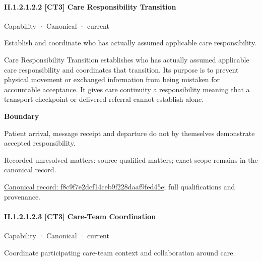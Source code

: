 \paragraph*{II.1.2.1.2.2 [CT3] Care Responsibility Transition}
\label{navigation:II.1.2.1.2.2}

\label{element:f8c9f7e2dcf14ceb9f228daaf9fed45e}
{\small Capability · Canonical · current}\par

Establish and coordinate who has actually assumed applicable care responsibility.



Care Responsibility Transition establishes who has actually assumed applicable care responsibility and coordinates that transition. Its purpose is to prevent physical movement or exchanged information from being mistaken for accountable acceptance. It gives care continuity a responsibility meaning that a transport checkpoint or delivered referral cannot establish alone.



\textbf{Boundary}



Patient arrival, message receipt and departure do not by themselves demonstrate accepted responsibility.


{\small Recorded unresolved matters: source-qualified matters; exact scope remains in the canonical record.}\par
{\footnotesize \href{../../../../../../../continuum/strategy/capability/f8c9f7e2dcf14ceb9f228daaf9fed45e.md}{Canonical record: f8c9f7e2dcf14ceb9f228daaf9fed45e}; full qualifications and provenance.}\par
\paragraph*{II.1.2.1.2.3 [CT3] Care-Team Coordination}
\label{navigation:II.1.2.1.2.3}

\label{element:bbd138aab70d4b06b43662fb3f5373db}
{\small Capability · Canonical · current}\par

Coordinate participating care-team context and collaboration around care.



